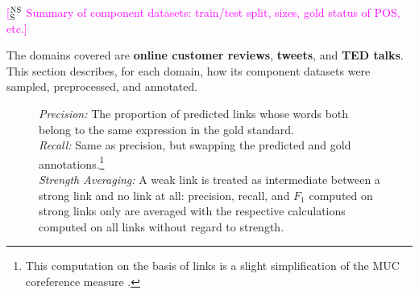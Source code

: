 \documentclass[11pt,letterpaper]{article}
\makeatletter
\newcommand{\ensuretext}[1]{#1}
\newcommand{\nssmarker}{\ensuretext{\textcolor{magenta}{\ensuremath{^{\textsc{NS}}_{\textsc{S}}}}}}
\newcommand{\arkcomment}[3]{\ensuretext{\textcolor{#3}{[#1 #2]}}}
\newcommand{\nss}[1]{\arkcomment{\nssmarker}{#1}{magenta}}
\newcommand{\tagtt}[3]{\begin{tabular}{@{\hspace{2pt}}c@{\hspace{2pt}}} \texttt{#2}\\ #1 \\ \texttt{#3}\end{tabular}}
\newcommand{\longversion}[1]{#1} %
\makeatother
\begin{document}
\begin{table}
\caption{\nss{Summary of component datasets: train/test split, sizes, gold status of POS, etc.}}
\label{tbl:datasets}
\end{table}

The domains covered are \textbf{online customer reviews}, 
\textbf{tweets}, and \textbf{TED talks}.
This section describes, for each domain, how its component datasets were sampled, preprocessed, 
and annotated.

\begin{figure} %
\begin{framed}\small
\emph{Precision:} The proportion of predicted links whose words 
both belong to the same expression in the gold standard. \\
\emph{Recall:} Same as precision, but swapping the predicted and gold annotations.\longversion{\footnote{This computation on the basis of links 
is a slight simplification of the MUC coreference measure \citep{vilain-95}.}} \\
\emph{Strength Averaging:} A weak link is treated as intermediate between a strong link and no link at all: 
precision, recall, and $F_1$ computed on strong links only are averaged 
with the respective calculations computed on all links without regard to strength.
\end{framed}\centering
{}
\end{figure}
\end{document}
